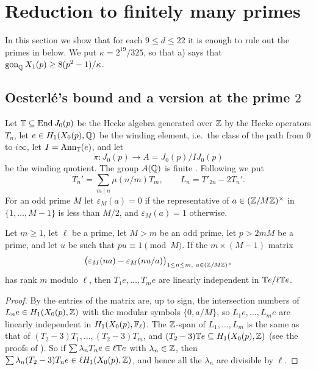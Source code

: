 \section{Reduction to finitely many primes}\label{sec:global}

In this section we show that for each $9\leq d\leq 22$ it is enough to rule out the primes in  below. We put $\kappa=2^{19}/325$, so that  a) says that $\operatorname{gon}_{\mathbb{Q}} X_1(p)\geq 8(p^2-1)/\kappa$.

\subsection{Oesterl\'e's bound and a version at the prime \texorpdfstring{$2$}{2}}\label{sec:dyadic}
Let $\mathbb{T}\subseteq\operatorname{End}J_0(p)$ be the Hecke algebra generated over $\mathbb{Z}$ by the Hecke operators $T_n$, let $e\in H_1(X_0(p),\mathbb{Q})$ be the winding element, i.e.\ the class of the path from $0$ to $i\infty$, let $I=\operatorname{Ann}_{\mathbb{T}}(e)$, and let
$$\pi:J_0(p)\to A=J_0(p)/IJ_0(p)$$
be the winding quotient. The group $A(\mathbb{Q})$ is finite \cite[Theorem 2.2]{DKSS}. Following \cite[Definition 6.5]{DKSS} we put
$$T_n'=\sum_{m\mid n}\mu(n/m)T_m,\qquad L_n=T'_{2n}-2T_n'.$$
For an odd prime $M$ let $\varepsilon_M(a)=0$ if the representative of $a\in(\mathbb{Z}/M\mathbb{Z})^\times$ in $\{1,\dots,M-1\}$ is less than $M/2$, and $\varepsilon_M(a)=1$ otherwise.

\begin{lemma}\label{lem:intersection}
Let $m\geq 1$, let $\ell$ be a prime, let $M>m$ be an odd prime, let $p>2mM$ be a prime, and let $u$ be such that $pu\equiv1\pmod M$. If the $m\times(M-1)$ matrix
$$\bigl(\varepsilon_M(na)-\varepsilon_M(nu/a)\bigr)_{1\leq n\leq m,\ a\in(\mathbb{Z}/M\mathbb{Z})^\times}$$
has rank $m$ modulo $\ell$, then $T_1e,\dots,T_me$ are linearly independent in $\mathbb{T} e/\ell\mathbb{T} e$.
\end{lemma}

\begin{proof}
By \cite[Lemma 6.7]{DKSS} the entries of the matrix are, up to sign, the intersection numbers of $L_ne\in H_1(X_0(p),\mathbb{Z})$ with the modular symbols $\{0,a/M\}$, so $L_1e,\dots,L_me$ are linearly independent in $H_1(X_0(p),\mathbb{F}_\ell)$. The $\mathbb{Z}$-span of $L_1,\dots,L_m$ is the same as that of $(T_2-3)T_1,\dots,(T_2-3)T_m$, and $(T_2-3)\mathbb{T} e\subseteq H_1(X_0(p),\mathbb{Z})$ (see the proofs of \cite[Corollaries 6.4 and 6.6]{DKSS}). So if $\sum\lambda_nT_ne\in\ell\mathbb{T} e$ with $\lambda_n\in\mathbb{Z}$, then $\sum\lambda_n(T_2-3)T_ne\in\ell H_1(X_0(p),\mathbb{Z})$, and hence all the $\lambda_n$ are divisible by $\ell$.
\end{proof}

